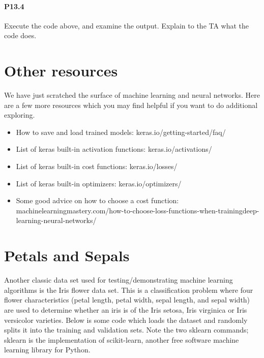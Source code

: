 \paragraph*{P13.4} Execute the code above, and examine the output. Explain to the TA what
the code does.

\section*{Other resources}

We have just scratched the surface of machine learning and neural networks. Here are a few more resources which you may find helpful if you want to do additional exploring.
\begin{itemize}
\item How to save and load trained models: keras.io/getting-started/faq/
\item List of keras built-in activation functions: keras.io/activations/
\item List of keras built-in cost functions: keras.io/losses/
\item List of keras built-in optimizers: keras.io/optimizers/
\item Some good advice on how to choose a cost function: machinelearningmastery.com/how-to-choose-loss-functions-when-trainingdeep-learning-neural-networks/

\end{itemize}

\section*{Petals and Sepals}
Another classic data set used for testing/demonstrating machine learning algorithms is the Iris flower data set. This is a classification problem where four flower
characteristics (petal length, petal width, sepal length, and sepal width) are used
to determine whether an iris is of the Iris setosa, Iris virginica or Iris versicolor
varieties. Below is some code which loads the dataset and randomly splits it
into the training and validation sets. Note the two sklearn commands; sklearn
is the implementation of scikit-learn, another free software machine learning
library for Python.

